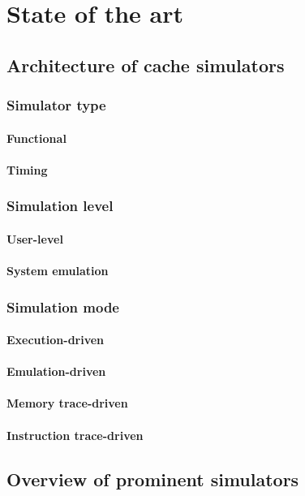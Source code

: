 
\chapter{State of the art} %

\section{Architecture of cache simulators}
%
\subsection{Simulator type}
\subsubsection{Functional}
\subsubsection{Timing}
%
\subsection{Simulation level}
\subsubsection{User-level}
\subsubsection{System emulation}
%
\subsection{Simulation mode}
\subsubsection{Execution-driven}
\subsubsection{Emulation-driven}
\subsubsection{Memory trace-driven}
\subsubsection{Instruction trace-driven}

\section{Overview of prominent simulators}
%
